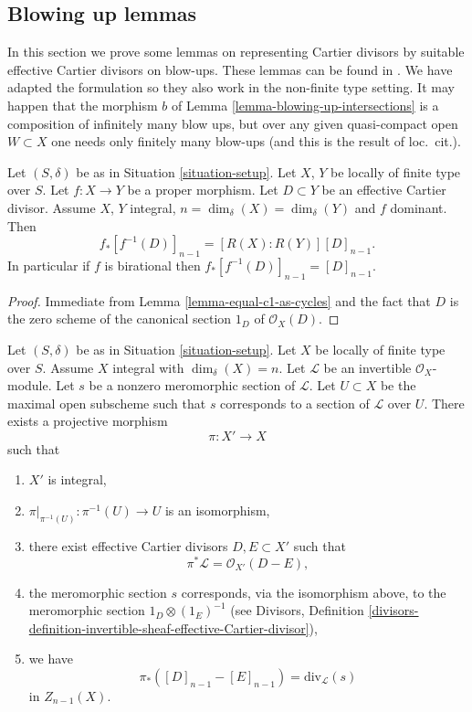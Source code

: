 \subsection{Blowing up lemmas}
\label{subsection-blowing-up-lemmas}

\noindent
In this section we prove some lemmas on representing
Cartier divisors by suitable effective Cartier divisors
on blow-ups. These lemmas can be found in \cite[Section 2.4]{F}.
We have adapted the formulation so they also work
in the non-finite type setting. It may happen that the morphism $b$
of Lemma \ref{lemma-blowing-up-intersections} is a composition of
infinitely many blow ups, but over any given quasi-compact open
$W \subset X$ one needs only finitely many blow-ups
(and this is the result of loc.\ cit.).

\begin{lemma}
\label{lemma-push-pull-effective-Cartier}
Let $(S, \delta)$ be as in Situation \ref{situation-setup}.
Let $X$, $Y$ be locally of finite type over $S$.
Let $f : X \to Y$ be a proper morphism.
Let $D \subset Y$ be an effective Cartier divisor.
Assume $X$, $Y$ integral, $n = \dim_\delta(X) = \dim_\delta(Y)$ and
$f$ dominant. Then
$$
f_*[f^{-1}(D)]_{n - 1} = [R(X) : R(Y)] [D]_{n - 1}.
$$
In particular if $f$ is birational then $f_*[f^{-1}(D)]_{n - 1} = [D]_{n - 1}$.
\end{lemma}

\begin{proof}
Immediate from Lemma \ref{lemma-equal-c1-as-cycles}
and the fact that $D$ is the zero
scheme of the canonical section $1_D$ of $\mathcal{O}_X(D)$.
\end{proof}

\begin{lemma}
\label{lemma-blowing-up-denominators}
Let $(S, \delta)$ be as in Situation \ref{situation-setup}.
Let $X$ be locally of finite type over $S$.
Assume $X$ integral with $\dim_\delta(X) = n$.
Let $\mathcal{L}$ be an invertible $\mathcal{O}_X$-module.
Let $s$ be a nonzero meromorphic section of $\mathcal{L}$.
Let $U \subset X$ be the maximal open subscheme such that
$s$ corresponds to a section of $\mathcal{L}$ over $U$.
There exists a projective morphism
$$
\pi : X' \longrightarrow X
$$
such that
\begin{enumerate}
\item $X'$ is integral,
\item $\pi|_{\pi^{-1}(U)} : \pi^{-1}(U) \to U$ is an isomorphism,
\item there exist effective Cartier divisors $D, E \subset X'$
such that
$$
\pi^*\mathcal{L} = \mathcal{O}_{X'}(D - E),
$$
\item the meromorphic section $s$ corresponds, via the isomorphism above,
to the meromorphic section $1_D \otimes (1_E)^{-1}$ (see
Divisors, Definition
\ref{divisors-definition-invertible-sheaf-effective-Cartier-divisor}),
\item we have
$$
\pi_*([D]_{n - 1} - [E]_{n - 1}) = \text{div}_\mathcal{L}(s)
$$
in $Z_{n - 1}(X)$.
\end{enumerate}
\end{lemma}

